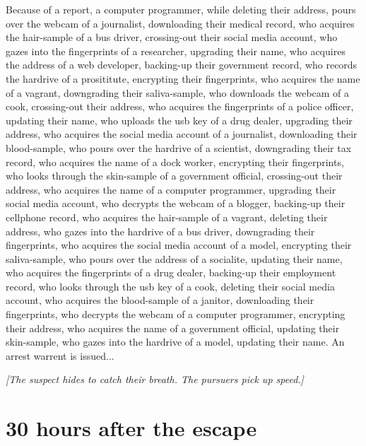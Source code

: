 \documentclass{report}
\begin{document}
Because of a report, a computer programmer, while deleting their address, pours over the webcam of a journalist, downloading their medical record, who acquires the hair-sample of a bus driver, crossing-out their social media account, who gazes into the fingerprints of a researcher, upgrading their name, who acquires the address of a web developer, backing-up their government record, who records the hardrive of a prosititute, encrypting their fingerprints, who acquires the name of a vagrant, downgrading their saliva-sample, who downloads the webcam of a cook, crossing-out their address, who acquires the fingerprints of a police officer, updating their name, who uploads the usb key of a drug dealer, upgrading their address, who acquires the social media account of a journalist, downloading their blood-sample, who pours over the hardrive of a scientist, downgrading their tax record, who acquires the name of a dock worker, encrypting their fingerprints, who looks through the skin-sample of a government official, crossing-out their address, who acquires the name of a computer programmer, upgrading their social media account, who decrypts the webcam of a blogger, backing-up their cellphone record, who acquires the hair-sample of a vagrant, deleting their address, who gazes into the hardrive of a bus driver, downgrading their fingerprints, who acquires the social media account of a model, encrypting their saliva-sample, who pours over the address of a socialite, updating their name, who acquires the fingerprints of a drug dealer, backing-up their employment record, who looks through the usb key of a cook, deleting their social media account, who acquires the blood-sample of a janitor, downloading their fingerprints, who decrypts the webcam of a computer programmer, encrypting their address, who acquires the name of a government official, updating their skin-sample, who gazes into the hardrive of a model, updating their name. An arrest warrent is issued...

\textit{[The suspect hides to catch their breath. The pursuers pick up speed.]}


\section*{30 \small{hours after the escape}}
\end{document}
